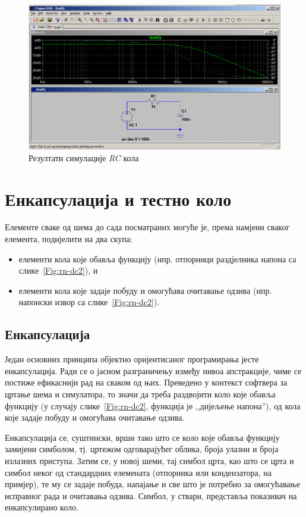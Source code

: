 \begin{figure}[h]
\centering
\includegraphics[width=\figwidth\textwidth]{figs/rc-ac2.PNG}
\caption{Резултати симулације \textit{RC} кола}
\label{Fig:rc-ac2}
\end{figure}

\chapter{Енкапсулација и тестно коло}

Елементе сваке од шема до сада посматраних могуће је, према намјени сваког елемента, подијелити на два скупа:
\begin{itemize}
\item елементи кола које обавља функцију (нпр. отпорници раздјелника напона са слике~\ref{Fig:rn-dc2}), и
\item елементи кола које задаје побуду и омогућава очитавање одзива (нпр. напонски извор са слике~\ref{Fig:rn-dc2}).
\end{itemize}

\section{Енкапсулација}

Један основних принципа објектно оријентисаног програмирања јесте енкапсулација. Ради се о јасном разграничењу између нивоа апстракције, чиме се постиже ефикаснији рад на сваком од њих. Преведено у контекст софтвера за цртање шема и симулатора, то значи да треба раздвојити коло које обавља функцију (у случају слике~\ref{Fig:rn-dc2}, функција је ,,дијељење напона''), од кола које задаје побуду и омогућава очитавање одзива.

Енкапсулација се, суштински, врши тако што се коло које обавља функцију замијени симболом, тј. цртежом одговарајућег облика, броја улазни и броја излазних приступа. Затим се, у новој шеми, тај симбол црта, као што се црта и симбол неког од стандардних елемената (отпорника или кондензатора, на примјер), те му се задаје побуда, напајање и све што је потребно за омогућавање исправног рада и очитавања одзива. Симбол, у ствари, представља показивач на енкапсулирано коло.

